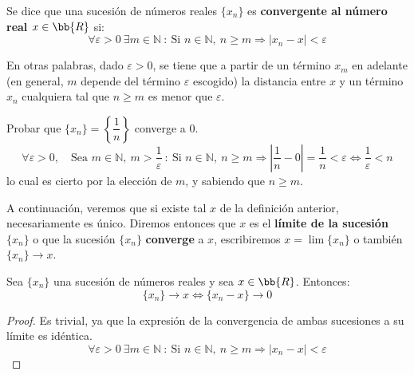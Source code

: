 \begin{definicion}
    Se dice que una sucesión de números reales  $\{x_n\}$ es \textbf{convergente al número real $x\in \bb{R}$} si:
    \begin{equation*}
        \forall \varepsilon > 0 ~\exists m \in \mathbb{N} ~:~ \text{Si $n \in \mathbb{N}$},~n \geq m \Longrightarrow \left| x_n - x \right| < \varepsilon
    \end{equation*}
\end{definicion}

En otras palabras, dado $\varepsilon > 0$, se tiene que a partir de un término $x_m$ en adelante (en general, $m$ depende del término
$\varepsilon$ escogido) la distancia entre $x$ y un término $x_n$ cualquiera tal que $n \geq m$ es menor que $\varepsilon$.

\begin{ejemplo}
    Probar que $\{x_n\}=\left\{\dfrac{1}{n}\right\}$ converge a 0.
    \begin{equation*}
        \forall \varepsilon > 0,\quad \text{Sea } m \in \mathbb{N},~m>\frac{1}{\varepsilon} ~:~ \text{Si $n \in \mathbb{N}$},~n \geq m \Longrightarrow \left|\frac{1}{n} -0\right| = \frac{1}{n} < \varepsilon \Longleftrightarrow \frac{1}{\varepsilon} < n
    \end{equation*}
    lo cual es cierto por la elección de $m$, y sabiendo que $n\geq m$.\\
\end{ejemplo}


A continuación, veremos que si existe tal $x$ de la definición anterior, necesariamente es único. Diremos entonces que
$x$ es el \textbf{límite de la sucesión $\{x_n\}$} o que la sucesión $\{x_n\}$ \textbf{converge}
a $x$, escribiremos $x= \lim \{x_n\}$ o también $\{x_n\}\longrightarrow x$.
\begin{lema}\label{lema:5.1.3}
    Sea $\{x_n\}$ una sucesión de números reales y sea $x\in \bb{R}$. Entonces:
    $$\{x_n\} \longrightarrow  x \Longleftrightarrow \{x_n - x\} \longrightarrow 0$$
\end{lema}
\begin{proof}
    Es trivial, ya que la expresión de la convergencia de ambas sucesiones a su límite es idéntica.
    \begin{equation*}
        \forall \varepsilon > 0 ~\exists m \in \mathbb{N} ~:~ \text{Si $n \in \mathbb{N}$},~n \geq m \Longrightarrow \left| x_n - x\right| < \varepsilon
    \end{equation*}
\end{proof}

